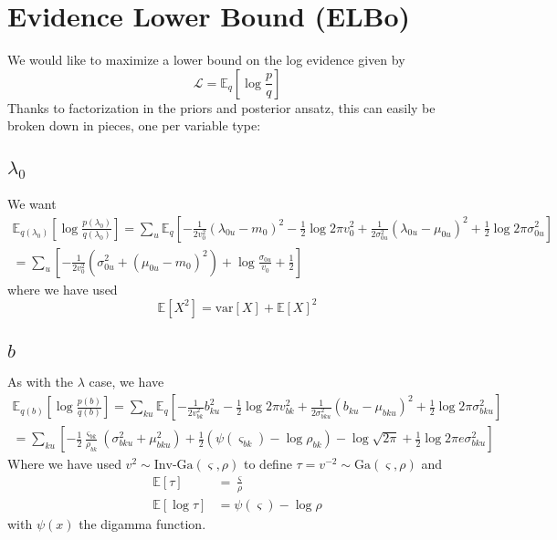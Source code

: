 \documentclass[11pt]{article}
\begin{document}
\section{Evidence Lower Bound (ELBo)}
We would like to maximize a lower bound on the log evidence given by
\begin{equation}
    \mathcal{L} = \mathbb{E}_q \left[ \log \frac{p}{q} \right]
\end{equation}
Thanks to factorization in the priors and posterior ansatz, this can easily be broken down in pieces, one per variable type:

\subsection{$\lambda_0$}
We want 
\begin{multline}
    \mathbb{E}_{q(\lambda_0)}\left[ \log \frac{p(\lambda_0)}{q(\lambda_0)}\right] = \sum_u \mathbb{E}_q\left[ -\frac{1}{2v_0^2} (\lambda_{0u} - m_0)^2
    - \frac{1}{2}\log 2\pi v_0^2
    + \frac{1}{2\sigma_{0u}^2} (\lambda_{0u} - \mu_{0u})^2
    + \frac{1}{2}\log 2\pi \sigma^2_{0u}
    \right] \\
    = \sum_u \left[
    -\frac{1}{2v_0^2} \left(\sigma^2_{0u} + (\mu_{0u} - m_0)^2 \right)
    + \log \frac{\sigma_{0u}}{v_0} + \frac{1}{2}
    \right] 
\end{multline}
where we have used 
\begin{equation}
    \mathbb{E}[X^2] = \mathrm{var}[X] + \mathbb{E}[X]^2
\end{equation}

\subsection{$b$}
As with the $\lambda$ case, we have 
\begin{multline}
    \mathbb{E}_{q(b)}\left[ \log \frac{p(b)}{q(b)}\right] = \sum_{ku} \mathbb{E}_q\left[ -\frac{1}{2v_{bk}^2} b_{ku}^2
    - \frac{1}{2}\log 2\pi v_{bk}^2
    + \frac{1}{2\sigma_{bku}^2} (b_{ku} - \mu_{bku})^2
    + \frac{1}{2}\log 2\pi \sigma^2_{bku} 
    \right] \\
    = \sum_{ku} \left[
    -\frac{1}{2}\frac{\varsigma_{bk}}{\rho_{bk}}\left(\sigma^2_{bku} + \mu^2_{bku} \right)
    + \frac{1}{2}(\psi(\varsigma_{bk}) - \log \rho_{bk}) - \log \sqrt{2\pi} + \frac{1}{2} \log 2\pi e \sigma^2_{bku}
    \right]
\end{multline}
Where we have used $v^2 \sim \text{Inv-Ga}(\varsigma, \rho)$ to define $\tau = v^{-2} \sim \mathrm{Ga}(\varsigma, \rho)$ and 
\begin{align}
    \mathbb{E}[\tau] &= \frac{\varsigma}{\rho} \\
    \mathbb{E}[\log \tau] &= \psi(\varsigma) - \log \rho
\end{align}
with $\psi(x)$ the digamma function.
\end{document}
